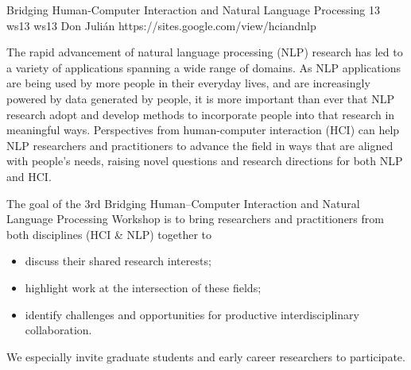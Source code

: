 \begin{wsschedulenolist}
{Bridging Human-Computer Interaction and Natural Language Processing}
{13}
{ws13}
{ws13}
{Don Juli\'an}
{https://sites.google.com/view/hciandnlp}

The rapid advancement of natural language processing (NLP) research has led to a variety of applications spanning a wide range of domains. As NLP applications are being used by more people in their everyday lives, and are increasingly powered by data generated by people, it is more important than ever that NLP research adopt and develop methods to incorporate people into that research in meaningful ways. Perspectives from human-computer interaction (HCI) can help NLP researchers and practitioners to advance the field in ways that are aligned with people's needs, raising novel questions and research directions for both NLP and HCI.

The goal of the 3rd Bridging Human--Computer Interaction and Natural Language Processing Workshop is to bring researchers and practitioners from both disciplines (HCI \& NLP) together to

\begin{itemize}
    \setlength{\itemsep}{-0.3ex}
    \item discuss their shared research interests;
    \item highlight work at the intersection of these fields;
    \item identify challenges and opportunities for productive interdisciplinary collaboration.
\end{itemize}

We especially invite graduate students and early career researchers to participate.

\end{wsschedulenolist}
